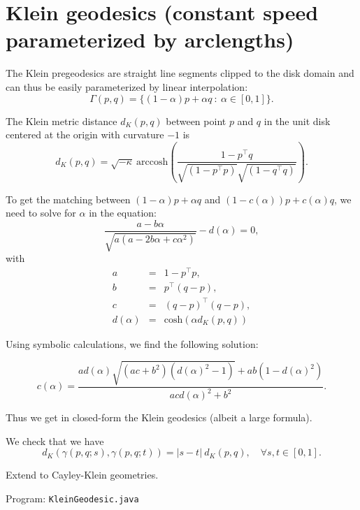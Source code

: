 \documentclass[12pt]{article}
\begin{document}
\def\arccosh{\mathrm{arccosh}}
\def\cosh{\mathrm{cosh}}

\section{Klein geodesics (constant speed parameterized by arclengths)}

The Klein pregeodesics are straight line segments clipped to the disk domain and can thus
 be easily parameterized by linear interpolation: 
$$
\Gamma(p,q)=\{(1-\alpha)p+\alpha q\ :\ \alpha\in [0,1]\}.
$$


The Klein metric distance $d_K(p,q)$ between point $p$ and $q$ in the unit disk centered at the origin with curvature $-1$ is
$$
d_K(p,q)=\sqrt{-\kappa }\ \arccosh \left( \frac{1-p^\top q}{\sqrt{(1-p^\top p)}\sqrt{(1-q^\top q)}} \right).
$$

 

To get the matching between $(1-\alpha)p+\alpha q$ and $(1-c(\alpha))p+ c(\alpha)q$, 
we need to solve for $\alpha$ in the equation:
$$
\frac{a-b\alpha}{\sqrt{a(a-2b\alpha+c\alpha^2)}}-d(\alpha)=0,
$$
with
\begin{eqnarray*}
a &=& 1-p^\top p,\\
b &=& p^\top (q-p),\\
c &=& (q-p)^\top (q-p) ,\\
d(\alpha) &=& \cosh(\alpha d_K(p,q))
\end{eqnarray*}

Using symbolic calculations, we find the following solution:


$$
c(\alpha) = \frac{   ad(\alpha) \sqrt{(ac+b^2)  (d(\alpha)^2-1)} +a b (1-d(\alpha)^2)}{a c d(\alpha)^2 + b^2}.
$$

Thus we get in closed-form the Klein geodesics (albeit a large formula).

We check that we have
$$
d_K(\gamma(p,q;s),\gamma(p,q;t))= |s-t|\ d_K(p,q),\quad \forall s,t\in [0,1].
$$


Extend to Cayley-Klein geometries.

Program: {\tt KleinGeodesic.java}
 
\end{document}

